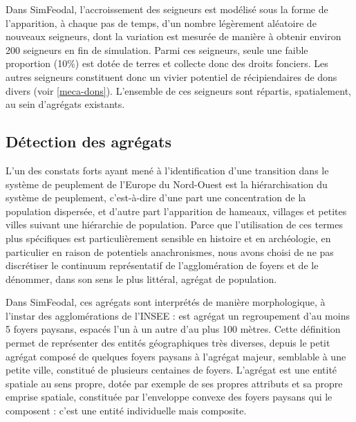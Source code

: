 Dans SimFeodal, l'accroissement des seigneurs est modélisé sous la forme de l'apparition, à chaque pas de temps, d'un nombre légèrement aléatoire de nouveaux seigneurs, dont la variation est mesurée de manière à obtenir environ 200 seigneurs en fin de simulation.
Parmi ces seigneurs, seule une faible proportion (10\%) est dotée de terres et collecte donc des droits fonciers. Les autres seigneurs constituent donc un vivier potentiel de récipiendaires de dons divers (voir \cref{meca-dons}).
L'ensemble de ces seigneurs sont répartis, spatialement, au sein d'agrégats existants.

\subsection{Détection des agrégats}

L'un des constats forts ayant mené à l'identification d'une \og transition\fg{} \autocite{pumain_convergences_2017, nuninger_cadre_2017} dans le système de peuplement de l'Europe du Nord-Ouest est la hiérarchisation du système de peuplement, c'est-à-dire d'une part une concentration de la population dispersée, et d'autre part l'apparition de hameaux, villages et petites villes suivant une hiérarchie de population.
Parce que l'utilisation de ces termes plus spécifiques est particulièrement sensible en histoire et en archéologie, en particulier en raison de potentiels anachronismes, nous avons choisi de ne pas discrétiser le continuum représentatif de l'agglomération de foyers et de le dénommer, dans son sens le plus littéral, \og agrégat\fg{} de population.

Dans SimFeodal, ces agrégats sont interprétés de manière morphologique, à l'instar des agglomérations de l'INSEE : est agrégat un regroupement d'au moins 5 foyers paysans, espacés l'un à un autre d'au plus 100 mètres.
Cette définition permet de représenter des entités géographiques très diverses, depuis le petit agrégat composé de quelques foyers paysans à l'agrégat majeur, semblable à une petite ville, constitué de plusieurs centaines de foyers.
L'agrégat est une entité spatiale au sens propre, dotée par exemple de ses propres attributs et sa propre emprise spatiale, constituée par l'enveloppe convexe des foyers paysans qui le composent : c'est une entité individuelle mais composite.


